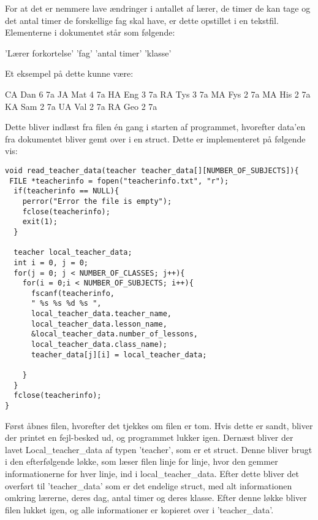 For at det er nemmere lave ændringer i antallet af lærer, de timer de kan tage og det antal timer de forskellige fag skal have, er dette opstillet i en tekstfil. 
Elementerne i dokumentet står som følgende:

’Lærer forkortelse’ ’fag’ ’antal timer’ ’klasse’

Et eksempel på dette kunne være:

    CA Dan 6 7a
    JA Mat 4 7a
    HA Eng 3 7a
    RA Tys 3 7a
    MA Fys 2 7a
    MA His 2 7a
    KA Sam 2 7a
    UA Val 2 7a
    RA Geo 2 7a

Dette bliver indlæst fra filen én gang i starten af programmet, hvorefter data’en fra dokumentet bliver gemt over i en struct.
Dette er implementeret på følgende vis:

\begin{lstlisting}
void read_teacher_data(teacher teacher_data[][NUMBER_OF_SUBJECTS]){
 FILE *teacherinfo = fopen("teacherinfo.txt", "r");
  if(teacherinfo == NULL){
    perror("Error the file is empty");
    fclose(teacherinfo);
    exit(1);
  }

  teacher local_teacher_data;
  int i = 0, j = 0;
  for(j = 0; j < NUMBER_OF_CLASSES; j++){
    for(i = 0;i < NUMBER_OF_SUBJECTS; i++){
      fscanf(teacherinfo,
      " %s %s %d %s ",
      local_teacher_data.teacher_name, 
      local_teacher_data.lesson_name, 
      &local_teacher_data.number_of_lessons, 
      local_teacher_data.class_name);
      teacher_data[j][i] = local_teacher_data; 
  
    } 
  }  
  fclose(teacherinfo);
}
\end{lstlisting}

Først åbnes filen, hvorefter det tjekkes om filen er tom. Hvis dette er sandt, bliver der printet en fejl-besked ud, og programmet lukker igen.
Dernæst bliver der lavet Local\_teacher\_data af typen ’teacher’, som er et struct. Denne bliver brugt i den efterfølgende løkke, som læser filen linje for linje, hvor den gemmer informationerne for hver linje, ind i local\_teacher\_data. Efter dette bliver det overført til ’teacher\_data’ som er det endelige struct, med alt informationen omkring lærerne, deres dag, antal timer og deres klasse. 
Efter denne løkke bliver filen lukket igen, og alle informationer er kopieret over i ’teacher\_data’.